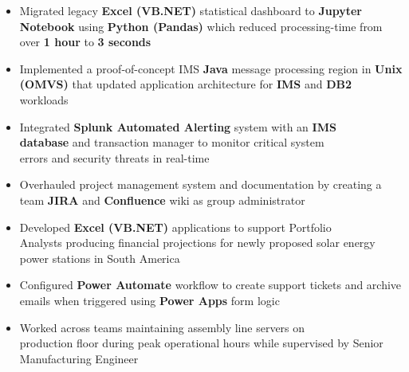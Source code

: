 \documentclass[10pt,a4paper,ragged2e,withhyper]{altacv}
\begin{document}
    \begin{paracol}{2}

        \begin{itemize}
            \item Migrated legacy \textbf{Excel (VB.NET)} statistical dashboard to \textbf{Jupyter Notebook} using \textbf{Python (Pandas)} which reduced processing-time from over \textbf{1 hour} to \textbf{3 seconds}
            \item Implemented a proof-of-concept IMS \textbf{Java} message processing region in \textbf{Unix (OMVS)} that updated application architecture for \textbf{IMS} and \textbf{DB2} workloads
            \item Integrated \textbf{Splunk Automated Alerting } system with an \textbf{IMS\\ database} and transaction manager to monitor critical system\\ errors and security threats in real-time
            \item Overhauled project management system and documentation by creating a team \textbf{JIRA} and \textbf{Confluence} wiki as group administrator
        \end{itemize}

        \medskip

        \begin{itemize}
            \item Developed \textbf{Excel (VB.NET)} applications to support Portfolio\\ Analysts producing financial projections for newly proposed solar energy power stations in South America
            \item Configured \textbf{Power Automate} workflow to create support tickets and archive emails when triggered using \textbf{Power Apps} form logic  
            \item Worked across teams maintaining assembly line servers on\\ production floor during peak operational hours while supervised by Senior Manufacturing Engineer
        \end{itemize}
        
        \medskip
        

\end{paracol}
\end{document}
